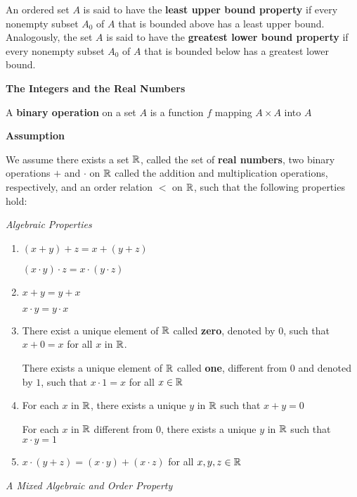 \begin{defn}
	An ordered set $A$ is said to have the \textbf{least upper bound property} if every nonempty subset $A_0$ of $A$ that is bounded above has a least upper bound. Analogously, the set $A$ is said to have the \textbf{greatest lower bound property} if every nonempty subset $A_0$ of $A$ that is bounded below has a greatest lower bound.
\end{defn}


\textbf{The Integers and the Real Numbers}

\begin{defn}
	A \textbf{binary operation} on a set $A$ is a function $f$ mapping $A \times A$ into $A$ 
\end{defn}

\textbf{Assumption}

We assume there exists a set $ \mathbb{R} $, called the set of \textbf{real numbers}, two binary operations $+$ and $ \cdot$ on $ \mathbb{R} $ called the addition and multiplication operations, respectively, and an order relation $ <$ on $ \mathbb{R}$, such that the following properties hold:

\textit{Algebraic Properties}
\begin{enumerate}
	\item $ (x + y ) + z = x + (y+z) $ 
	
	$ (x \cdot y) \cdot z = x \cdot(y \cdot z) $
	
	\item $ x + y = y + x $
	
	$ x \cdot y = y \cdot x $
	
	\item There exist a unique element of $\mathbb{R}$ called \textbf{zero}, denoted by $0$, such that $ x+ 0 = x$ for all $x$ in $\mathbb{R}$.
	
	There exists a unique element of $\mathbb{R}$ called \textbf{one}, different from $0$ and denoted by $1$, such that $ x \cdot 1 = x$ for all $x \in \mathbb{R}$
	\item For each $x$ in $\mathbb{R}$, there exists a unique $y$ in $\mathbb{R}$ such that $ x+ y = 0$
	
	For each $x$ in $\mathbb{R}$ different from $0$, there exists a unique $y$ in $\mathbb{R}$ such that $x\cdot y = 1$ 
	
	\item $ x \cdot (y +z) = (x \cdot y )+ (x \cdot z)$ for all $x,y,z \in \mathbb{R}$
	
\end{enumerate}

\textit{A Mixed Algebraic and Order Property}

